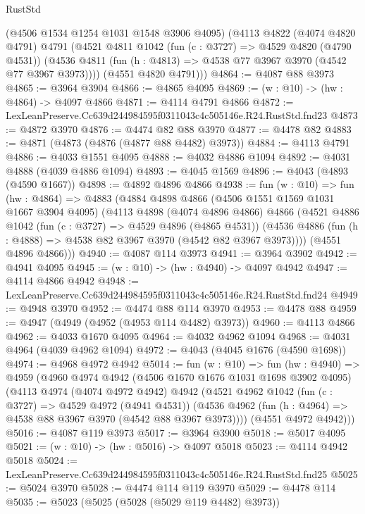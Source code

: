 \begin{lexlean}{RustStd}
\begin{coremodule}
      (@4506 @1534 @1254 @1031 @1548 @3906 @4095)
      (@4113
        @4822
        (@4074 @4820 @4791)
        @4791
        (@4521
          @4811
          @1042
          (fun (c : @3727) => @4529 @4820 (@4790 @4531))
          (@4536 @4811 (fun (h : @4813) => @4538 @77 @3967 @3970 (@4542 @77 @3967 @3973))))
        (@4551 @4820 @4791)))
@4864 := @4087 @88 @3973
@4865 := @3964 @3904
@4866 := @4865 @4095
@4869 := (w : @10) -> (hw : @4864) -> @4097 @4866
@4871 := @4114 @4791 @4866
@4872 := LexLeanPreserve.Cc639d244984595f0311043c4c505146e.R24.RustStd.fnd23
@4873 := @4872 @3970
@4876 := @4474 @82 @88 @3970
@4877 := @4478 @82
@4883 := @4871 (@4873 (@4876 (@4877 @88 @4482) @3973))
@4884 := @4113 @4791
@4886 := @4033 @1551 @4095
@4888 := @4032 @4886 @1094
@4892 := @4031 @4888 (@4039 @4886 @1094)
@4893 := @4045 @1569
@4896 := @4043 (@4893 (@4590 @1667))
@4898 := @4892 @4896 @4866
@4938 := fun (w : @10) =>
  fun (hw : @4864) =>
  @4883
    (@4884
      @4898
      @4866
      (@4506 @1551 @1569 @1031 @1667 @3904 @4095)
      (@4113
        @4898
        (@4074 @4896 @4866)
        @4866
        (@4521
          @4886
          @1042
          (fun (c : @3727) => @4529 @4896 (@4865 @4531))
          (@4536 @4886 (fun (h : @4888) => @4538 @82 @3967 @3970 (@4542 @82 @3967 @3973))))
        (@4551 @4896 @4866)))
@4940 := @4087 @114 @3973
@4941 := @3964 @3902
@4942 := @4941 @4095
@4945 := (w : @10) -> (hw : @4940) -> @4097 @4942
@4947 := @4114 @4866 @4942
@4948 := LexLeanPreserve.Cc639d244984595f0311043c4c505146e.R24.RustStd.fnd24
@4949 := @4948 @3970
@4952 := @4474 @88 @114 @3970
@4953 := @4478 @88
@4959 := @4947 (@4949 (@4952 (@4953 @114 @4482) @3973))
@4960 := @4113 @4866
@4962 := @4033 @1670 @4095
@4964 := @4032 @4962 @1094
@4968 := @4031 @4964 (@4039 @4962 @1094)
@4972 := @4043 (@4045 @1676 (@4590 @1698))
@4974 := @4968 @4972 @4942
@5014 := fun (w : @10) =>
  fun (hw : @4940) =>
  @4959
    (@4960
      @4974
      @4942
      (@4506 @1670 @1676 @1031 @1698 @3902 @4095)
      (@4113
        @4974
        (@4074 @4972 @4942)
        @4942
        (@4521
          @4962
          @1042
          (fun (c : @3727) => @4529 @4972 (@4941 @4531))
          (@4536 @4962 (fun (h : @4964) => @4538 @88 @3967 @3970 (@4542 @88 @3967 @3973))))
        (@4551 @4972 @4942)))
@5016 := @4087 @119 @3973
@5017 := @3964 @3900
@5018 := @5017 @4095
@5021 := (w : @10) -> (hw : @5016) -> @4097 @5018
@5023 := @4114 @4942 @5018
@5024 := LexLeanPreserve.Cc639d244984595f0311043c4c505146e.R24.RustStd.fnd25
@5025 := @5024 @3970
@5028 := @4474 @114 @119 @3970
@5029 := @4478 @114
@5035 := @5023 (@5025 (@5028 (@5029 @119 @4482) @3973))

\end{coremodule}
\end{lexlean}
